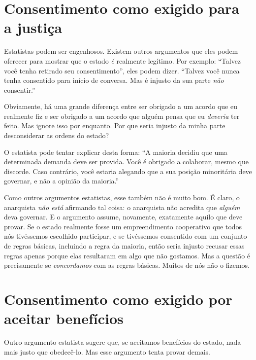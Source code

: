 \section{Consentimento como exigido para a justiça}

Estatistas podem ser engenhosos. Existem outros argumentos que eles podem oferecer para mostrar que o estado \emph{é} realmente legítimo. Por exemplo: ``Talvez você tenha retirado seu consentimento'', eles podem dizer. ``Talvez você nunca tenha consentido para início de conversa. Mas é injusto da sua parte \emph{não} consentir.''

Obviamente, há uma grande diferença entre ser obrigado a um acordo que eu realmente fiz e ser obrigado a um acordo que alguém pensa que eu \emph{deveria} ter feito. Mas ignore isso por enquanto. Por que seria injusto da minha parte desconsiderar as ordens do estado?

O estatista pode tentar explicar desta forma: ``A maioria decidiu que uma determinada demanda deve ser provida. Você é obrigado a colaborar, mesmo que discorde. Caso contrário, você estaria alegando que a sua posição minoritária deve governar, e não a opinião da maioria.''

Como outros argumentos estatistas, esse também não é muito bom. É claro, o anarquista \emph{não está} afirmando tal coisa: o anarquista não acredita que \emph{alguém} deva governar. E o argumento assume, novamente, exatamente aquilo que deve provar. Se o estado realmente fosse um empreendimento cooperativo que todos nós tivéssemos escolhido participar, e se tivéssemos consentido com um conjunto de regras básicas, incluindo a regra da maioria, então seria injusto recusar essas regras apenas porque elas resultaram em algo que não gostamos. Mas a questão é precisamente se \emph{concordamos} com as regras básicas. Muitos de nós não o fizemos.

\section{Consentimento como exigido por aceitar benefícios}

Outro argumento estatista sugere que, se aceitamos benefícios do estado, nada mais justo que obedecê-lo. Mas esse argumento tenta provar demais.


